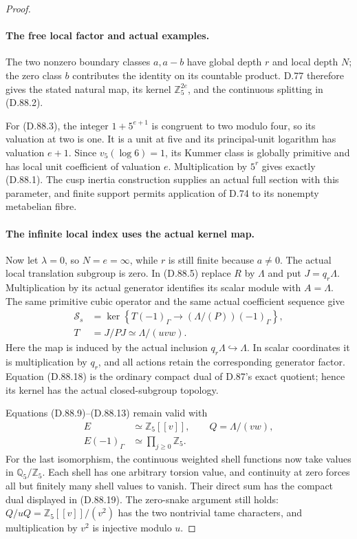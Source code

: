 \begin{proof}
\paragraph{The free local factor and actual examples.}
The two nonzero boundary classes \(a,a-b\) have global
depth \(r\) and local depth \(N\); the zero class \(b\)
contributes the identity on its countable product. D.77 therefore
gives the stated natural map, its kernel \(\mathbb Z_5^{2e}\),
and the continuous splitting in (D.88.2).

For (D.88.3), the integer \(1+5^{e+1}\) is congruent to two
modulo four, so its valuation at two is one. It is a unit at
five and its principal-unit logarithm has valuation \(e+1\).
Since \(v_5(\log6)=1\), its Kummer class is globally primitive
and has local unit coefficient of valuation \(e\).
Multiplication by \(5^r\) gives exactly (D.88.1).
The cusp inertia construction supplies an actual full section
with this parameter, and finite support permits application
of D.74 to its nonempty metabelian fibre.

\paragraph{The infinite local index uses the actual kernel map.}
Now let \(\lambda=0\), so \(N=e=\infty\), while \(r\)
is still finite because \(a\ne0\). The actual local translation
subgroup is zero. In (D.88.5) replace \(R\) by \(\Lambda\)
and put \(J=q_r\Lambda\). Multiplication by its actual
generator identifies its scalar module with \(A=\Lambda\).
The same primitive cubic operator and the same actual coefficient
sequence give
\[
 \begin{aligned}
 \mathcal S_s&=\ker\left\{
      T(-1)_\Gamma\longrightarrow(\Lambda/(P))(-1)_\Gamma
                         \right\},\\
 T&=J/PJ\simeq\Lambda/(uvw).
 \end{aligned}                                         \tag{D.88.18}
\]
Here the map is induced by the actual inclusion
\(q_r\Lambda\hookrightarrow\Lambda\). In scalar coordinates
it is multiplication by \(q_r\), and all actions retain the
corresponding generator factor. Equation (D.88.18) is the
ordinary compact dual of D.87's exact quotient; hence its kernel
has the actual closed-subgroup topology.

Equations (D.88.9)--(D.88.13) remain valid with
\[
 \begin{aligned}
 E&\simeq\mathbb Z_5[[v]],\qquad Q=\Lambda/(vw),\\
 E(-1)_\Gamma&\simeq\prod_{j\ge0}\mathbb Z_5.
 \end{aligned}                                         \tag{D.88.19}
\]
For the last isomorphism, the continuous weighted shell functions
now take values in \(\mathbb Q_5/\mathbb Z_5\). Each shell
has one arbitrary torsion value, and continuity at zero forces
all but finitely many shell values to vanish. Their direct sum
has the compact dual displayed in (D.88.19). The zero-snake
argument still holds: \(Q/uQ=\mathbb Z_5[[v]]/(v^2)\)
has the two nontrivial tame characters, and multiplication by
\(v^2\) is injective modulo \(u\).


\end{proof}

